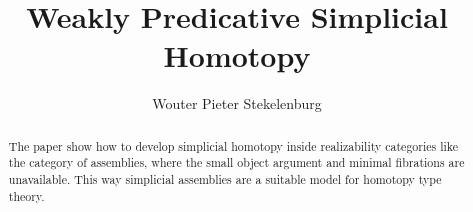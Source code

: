 \documentclass{tac}
\title{Weakly Predicative Simplicial Homotopy}
\author{Wouter Pieter Stekelenburg}\copyrightyear{2015}
\newcommand\hide[1]{}
\begin{document}
\begin{abstract} The paper show how to develop simplicial homotopy inside realizability categories like the category of assemblies, where the small object argument and minimal fibrations are unavailable. This way simplicial assemblies are a suitable model for homotopy type theory.\end{abstract}

\hide{
Three papers:
-simplicial homotopy
-complete categories
-the realizability model of HOTT


Idee: reverse the order. definitions--theorem--lemmas. That way the purpose of the lemmas is set up from the start.

}

\maketitle

\hide{
Thorough investigation of the background. If we have an ELCCC then the poset-reflection is a Heyting algebra. The reindexing morphisms between the poset reflections are Heyting algebra morphisms and its adjoints remain adjoints.

}
\end{document}
